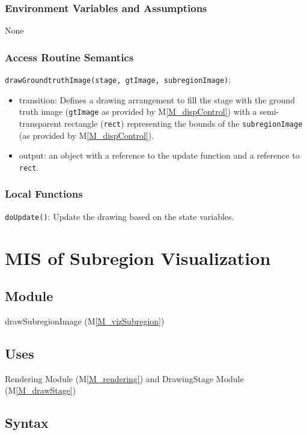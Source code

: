 \documentclass[12pt, titlepage]{article}
\newcommand{\mref}[1]{M\ref{#1}}
\newcommand{\mrefp}[1]{(\mref{#1})}
\newcommand{\mreff}[1]{Module \mrefp{#1}}
\newcommand{\code}[1]{\texttt{#1}}
\begin{document}
\subsubsection{Environment Variables and Assumptions}
None

\subsubsection{Access Routine Semantics}

\noindent \code{drawGroundtruthImage(stage, gtImage, subregionImage)}:
\begin{itemize}
\item transition: Defines a drawing arrangement to fill the stage with the ground truth image
  (\code{gtImage} as provided by \mref{M_dispControl})
  with a semi-transparent rectangle (\code{rect}) representing the bounds of the
  \code{subregionImage} (as provided by \mref{M_dispControl}).
\item output: an object with a reference to the update function and a reference to \code{rect}.
\end{itemize}

\subsubsection{Local Functions}
\code{doUpdate()}: Update the drawing based on the state variables.

\newpage



\section{MIS of Subregion Visualization} \label{MS_vizSubregion}

\subsection{Module}
drawSubregionImage \mrefp{M_vizSubregion}

\subsection{Uses}
Rendering \mreff{M_rendering} and DrawingStage \mreff{M_drawStage}

\subsection{Syntax}
\end{document}
